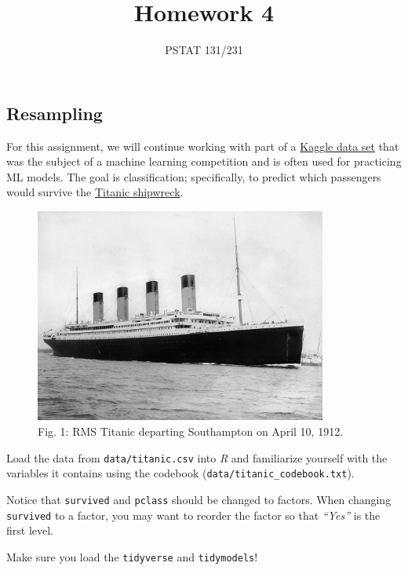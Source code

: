 \documentclass[
]{article}
\title{Homework 4}
\author{PSTAT 131/231}
\date{}
\begin{document}
\maketitle

{
\setcounter{tocdepth}{2}
\tableofcontents
}
\hypertarget{resampling}{%
\subsection{Resampling}\label{resampling}}

For this assignment, we will continue working with part of a
\href{https://www.kaggle.com/c/titanic/overview}{Kaggle data set} that
was the subject of a machine learning competition and is often used for
practicing ML models. The goal is classification; specifically, to
predict which passengers would survive the
\href{https://en.wikipedia.org/wiki/Titanic}{Titanic shipwreck}.

\begin{figure}
\centering
\includegraphics[width=3.78125in,height=\textheight]{images/RMS_Titanic.jpg}
\caption{Fig. 1: RMS Titanic departing Southampton on April 10, 1912.}
\end{figure}

Load the data from \texttt{data/titanic.csv} into \emph{R} and
familiarize yourself with the variables it contains using the codebook
(\texttt{data/titanic\_codebook.txt}).

Notice that \texttt{survived} and \texttt{pclass} should be changed to
factors. When changing \texttt{survived} to a factor, you may want to
reorder the factor so that \emph{``Yes''} is the first level.

Make sure you load the \texttt{tidyverse} and \texttt{tidymodels}!
\end{document}
